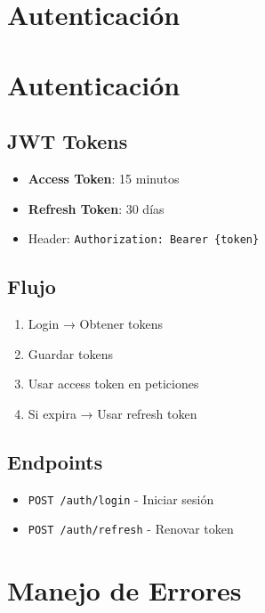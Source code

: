 \documentclass[
  spanish,
  11pt,
  letterpaper,
]{book}
\providecommand{\tightlist}{%
  \setlength{\itemsep}{0pt}\setlength{\parskip}{0pt}}
\begin{document}
\chapter{Autenticación}\label{autenticaciuxf3n}

\chapter{Autenticación}\label{autenticaciuxf3n-1}

\section{JWT Tokens}\label{jwt-tokens}

\begin{itemize}
\tightlist
\item
  \textbf{Access Token}: 15 minutos
\item
  \textbf{Refresh Token}: 30 días
\item
  Header: \texttt{Authorization:\ Bearer\ \{token\}}
\end{itemize}

\section{Flujo}\label{flujo}

\begin{enumerate}
\def\labelenumi{\arabic{enumi}.}
\tightlist
\item
  Login → Obtener tokens
\item
  Guardar tokens
\item
  Usar access token en peticiones
\item
  Si expira → Usar refresh token
\end{enumerate}

\section{Endpoints}\label{endpoints}

\begin{itemize}
\tightlist
\item
  \texttt{POST\ /auth/login} - Iniciar sesión
\item
  \texttt{POST\ /auth/refresh} - Renovar token
\end{itemize}

\chapter{Manejo de Errores}\label{manejo-de-errores-1}
\end{document}
